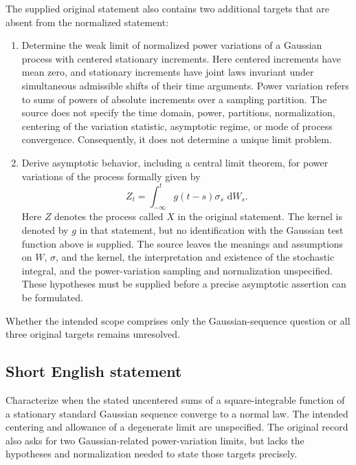 \documentclass[11pt]{article}
\newcommand{\dd}{\,\mathrm{d}}
\begin{document}
The supplied original statement also contains two additional targets that are absent from the normalized statement:
\begin{enumerate}
\item Determine the weak limit of normalized power variations of a Gaussian process with centered stationary increments. Here centered increments have mean zero, and stationary increments have joint laws invariant under simultaneous admissible shifts of their time arguments. Power variation refers to sums of powers of absolute increments over a sampling partition. The source does not specify the time domain, power, partitions, normalization, centering of the variation statistic, asymptotic regime, or mode of process convergence. Consequently, it does not determine a unique limit problem.
\item Derive asymptotic behavior, including a central limit theorem, for power variations of the process formally given by
\[
Z_t=\int_{-\infty}^{t}g(t-s)\sigma_s\,\dd W_s.
\]
Here \(Z\) denotes the process called \(X\) in the original statement. The kernel is denoted by \(g\) in that statement, but no identification with the Gaussian test function above is supplied. The source leaves the meanings and assumptions on \(W\), \(\sigma\), and the kernel, the interpretation and existence of the stochastic integral, and the power-variation sampling and normalization unspecified. These hypotheses must be supplied before a precise asymptotic assertion can be formulated.
\end{enumerate}
Whether the intended scope comprises only the Gaussian-sequence question or all three original targets remains unresolved.
\subsection{Short English statement}
Characterize when the stated uncentered sums of a square-integrable function of a stationary standard Gaussian sequence converge to a normal law. The intended centering and allowance of a degenerate limit are unspecified. The original record also asks for two Gaussian-related power-variation limits, but lacks the hypotheses and normalization needed to state those targets precisely.
\end{document}
